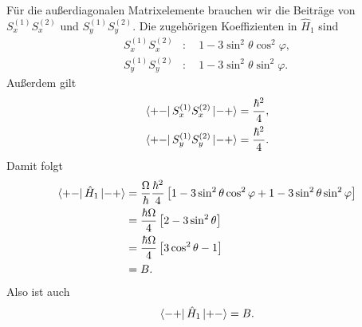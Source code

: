\documentclass[11pt,a4paper]{scrartcl}
\newcommand{\op}[1]{\hat{#1}}
\begin{document}
\begin{enumerate}[label=(\alph*)]
\begin{calculationbox}
            \begin{calculationbox}[title=Außerdiagonale Matrixelemente]
                Für die außerdiagonalen Matrixelemente brauchen wir die Beiträge von $S_x^{(1)}S_x^{(2)}$ und $S_y^{(1)}S_y^{(2)}$. Die zugehörigen Koeffizienten in $\op H_1$ sind
                \begin{align*}
                    S_x^{(1)}S_x^{(2)} &: \quad 1-3\sin^2\theta\cos^2\varphi,\\
                    S_y^{(1)}S_y^{(2)} &: \quad 1-3\sin^2\theta\sin^2\varphi.
                \end{align*}
                Außerdem gilt
                \begin{align*}
                    \bra{+-}S_x^{(1)}S_x^{(2)}\ket{-+}
                    &=
                    \frac{\hbar^2}{4},\\
                    \bra{+-}S_y^{(1)}S_y^{(2)}\ket{-+}
                    &=
                    \frac{\hbar^2}{4}.
                \end{align*}
                Damit folgt
                \begin{align*}
                    \bra{+-}\op H_1\ket{-+}
                    &=
                    \frac{\Omega}{\hbar}
                    \frac{\hbar^2}{4}
                    \left[
                        1-3\sin^2\theta\cos^2\varphi
                        +1-3\sin^2\theta\sin^2\varphi
                    \right]\\
                    &=
                    \frac{\hbar\Omega}{4}
                    \left[2-3\sin^2\theta\right]\\
                    &=
                    \frac{\hbar\Omega}{4}
                    \left[3\cos^2\theta-1\right]\\
                    &=
                    B.
                \end{align*}
                Also ist auch
                \begin{align*}
                    \bra{-+}\op H_1\ket{+-}=B.
                \end{align*}
            \end{calculationbox}


\end{calculationbox}
\end{enumerate}
\end{document}
